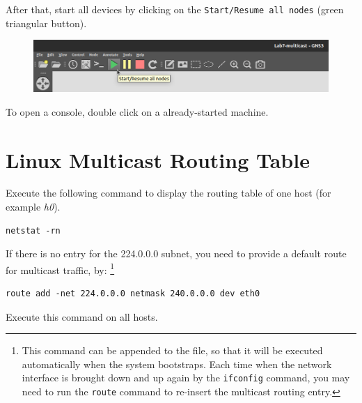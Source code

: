 \documentclass{../UTNetLab}
\begin{document}
    After that, start all devices by clicking on the \texttt{Start/Resume all nodes} (green triangular button).
    \begin{figure}[H]
        \centering
        \includegraphics[scale=1.6]{img/start-all}
    \end{figure}

    To open a console, double click on a already-started machine.


\section{Linux Multicast Routing Table\label{sec:rt}}
\label{sec:linux-multicast-routing}
    Execute the following command to display the routing table of one host (for example \textit{h0}).

    \begin{lstlisting}
netstat -rn
    \end{lstlisting}
    
    If there is no entry for the 224.0.0.0 subnet, you need to provide a default route for multicast traffic, by:
    \footnote{This command can be appended to the  file, so that it will be executed automatically when the system bootstraps.
    Each time when the network interface is brought down and up again by the \lstinline{ifconfig} command, you may need to run the \lstinline{route} command to re-insert the multicast routing entry.}

    \begin{lstlisting}[emph=eth0]
route add -net 224.0.0.0 netmask 240.0.0.0 dev eth0
    \end{lstlisting}
    
    Execute this command on all hosts.
\end{document}
